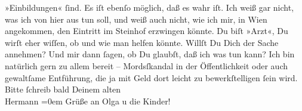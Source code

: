 \begin{ledgroupsized}[t]{13cm}
               »Einbildungen« ſind. Es iſt ebenſo möglich, daß es wahr iſt. Ich weiß gar nicht, was
               ich von hier aus tun soll, und weiß auch nicht, wie ich mir, in Wien angekommen, den Eintritt im Steinhof erzwingen könnte. Du biſt »Arzt«, Du wirſt eher wiſſen, ob und wie
               man helfen könnte. Willſt Du Dich der Sache annehmen? Und mir dann ſagen, ob Du
               glaubſt, daß ich was tun kann? Ich bin natürlich gern zu allem bereit – Mordsſkandal
               in der Öffentlichkeit oder auch gewaltſame Entführung, die ja mit Geld dort leicht zu
               bewerkſtelligen ſein wird. Bitte ſchreib bald\pend
           \pstart
           Deinem alten{\\[\baselineskip]}\spacefill\mbox{Hermann}\pend
           \leftskip=0em{}\pstart
           \noindent{}Grüße an Olga u die Kinder!\pend
           
         
         \endnumbering{}\end{ledgroupsized}  \newcommand{\dateiname}{L02121}\newcommand{\titel}{Hermann Bahr an Arthur Schnitzler, 16. 4. 1913}\newcommand{\editorInnen}{ Kurt Ifkovits,  Martin Anton Müller}
      